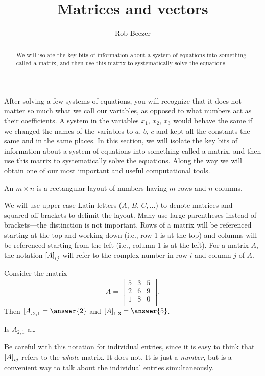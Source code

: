 \documentclass{ximera}
\author{Rob Beezer}
\title{Matrices and vectors}
\begin{document}
\begin{abstract}
  We will isolate the key bits of information about a system of
  equations into something called a matrix, and then use this matrix
  to systematically solve the equations.
\end{abstract}
\maketitle

After solving a few systems of equations, you will recognize that it does not matter so much what we call our variables, as opposed to what numbers act as their coefficients.  A system in the variables $x_1,\,x_2,\,x_3$  would behave the same if we changed the names of the variables to $a,\,b,\,c$ and kept all the constants the same and in the same places.  In this section, we will isolate the key bits of information about a system of equations into something called a matrix, and then use this matrix to systematically solve the equations.  Along the way we will obtain one of our most important and useful computational tools.

\begin{definition}
  An $m\times n$  is a rectangular layout of numbers having $m$ rows and $n$ columns.
\end{definition}

We will use upper-case Latin letters ($A,\,B,\,C,\dotsc$) to denote
matrices and squared-off brackets to delimit the layout.  Many use
large parentheses instead of brackets---the distinction is not
important.  Rows of a matrix will be referenced starting at the top
and working down (i.e., row 1 is at the top) and columns will be
referenced starting from the left (i.e., column 1 is at the left).
For a matrix $A$, the notation $\left\lbrack A\right\rbrack_{ij}$ will refer to the
complex number in row $i$ and column $j$ of $A$.

\begin{exercise}
  Consider the matrix
  \[
    A = \begin{bmatrix}
      5 & 3 & 5 \\
      2 & 6 & 9 \\
      1 & 8 & 0 \\
    \end{bmatrix}.
  \]
  Then $\matrixentry{A}{2,1} = \answer{2}$ and $\matrixentry{A}{1,3} = \answer{5}$.
\end{exercise}

\begin{question}
  Is $A_{2,1}$ a\ldots
  \begin{multipleChoice}
  \end{multipleChoice}
  
  \begin{feedback}
    Be careful with this notation for individual entries, since
    it is easy to think that $\left\lbrack A\right\rbrack_{ij}$ refers to the
    \emph{whole} matrix.  It does not.  It is just a
    \emph{number,} but is a convenient way to talk about the
    individual entries simultaneously.
  \end{feedback}
\end{question}
\end{document}
